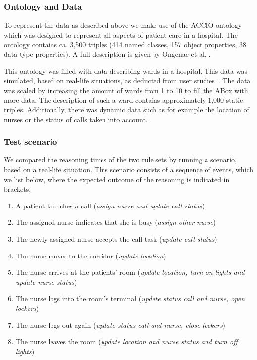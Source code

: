 \subsubsection{Ontology and Data}\label{ont}
To represent the data as described above we make use of the ACCIO ontology which was designed to represent all aspects of patient care in a hospital. 
The ontology contains ca. 
3,500 triples (414 named classes, 157 object properties,  38 data type properties).
A full description is given by Ongenae et al. \cite{accioont}. 

This ontology was filled with data describing wards in a hospital.
This data was simulated, based on real-life situations, as deducted from user studies~\cite{accioont}.
The data was scaled by increasing the amount of wards from 1 to 10 to fill the ABox with more data. The description of such a ward contains
approximately 1,000 static triples. Additionally, there was dynamic data such as for example the location of nurses or the status of calls taken into account.

\subsubsection{Test scenario}
We compared the reasoning times of the two rule sets by running a scenario, based on a real-life situation.
This scenario consists of a sequence of events, which we list below, where the expected outcome of the reasoning is indicated in brackets. 

\begin{enumerate}
\item
A patient launches a call (\emph{assign nurse and update call status})
\item
The assigned nurse indicates that she is busy (\emph{assign other nurse})
\item
The newly assigned nurse accepts the call task (\emph{update call status})
\item 
The nurse moves to the corridor (\emph{update location})
\item 
The nurse arrives at the patients' room (\emph{update location, turn on lights  and update nurse status})
\item 
The nurse logs into the room's terminal (\emph{update status call and nurse, open lockers})
\item 
The nurse logs out again (\emph{update status call and nurse, close lockers})
\item 
The nurse leaves the room (\emph{update location and nurse status and turn off lights})
\end{enumerate}

